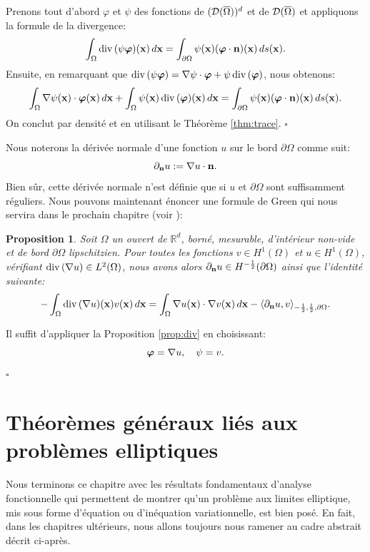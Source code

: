 \documentclass[11pt]{book}
\newtheorem{proposition}[theorem]{Proposition}
\newcommand{\bp}{\begin{proposition}}
\newcommand{\ep}{\end{proposition}}
\newcommand{\cqfd}{{$\mbox{}$\hfill$\square$}}
\def\n{{\bf n}}
\def\x{{\bf x}}
\newcommand{\caD}{{\cal D}}
\newcommand{\R}{\mathbb{R}}
\newcommand{\bphi}{\mbox{\boldmath{$\varphi$}}}
\renewcommand{\div} {{\rm{div} \,}}
\newcommand{\dnu}{\partial_{\n} u}
\begin{document}
\proof Prenons tout d'abord $\varphi$ et $\psi$ des fonctions de $(\caD(\overline{\Omega}))^d$ et de 
$\caD(\overline{\Omega})$ et appliquons la formule de la divergence:
\[
 \int_\Omega \div ( \psi \bphi ) (\x) \,d\x = \int_{\partial \Omega} \psi (\x) ( \bphi \cdot \n ) (\x) \,ds(\x).
\]
Ensuite, en remarquant que $\div ( \psi \bphi ) = \nabla \psi \cdot \bphi + \psi \, \div ( \bphi )$, nous obtenons:
\[
 \int_\Omega \nabla \psi (\x) \cdot \bphi (\x) \,d\x 
 + 
 \int_\Omega \psi (\x) \, \div ( \bphi ) (\x) \,d\x 
 = \int_{\partial \Omega} \psi (\x) ( \bphi \cdot \n ) (\x) \,ds(\x).
\]
On conclut par densité et en utilisant le Théorème \ref{thm:trace}.
\cqfd

\medskip

Nous noterons la dérivée normale d'une fonction $u$ sur le bord $\partial \Omega$ comme suit:
\[\dnu := \nabla u \cdot \n.\] 
Bien sûr, cette dérivée normale n'est définie que si $u$ et $\partial \Omega$ sont suffisamment réguliers.
Nous pouvons maintenant énoncer une formule de Green qui nous servira dans le prochain chapitre (voir \cite[Corollary B.59]{ern-guermond-04}):

\bp \label{prop:Green} Soit $\Omega$ un ouvert de $\R^d$, borné, mesurable, d'intérieur non-vide et de bord  $\partial \Omega$ lipschitzien. Pour toutes les fonctions $v\in H^1(\Omega)$ et $u\in H^1(\Omega)$, vérifiant $\div ( \nabla u)\in L^2(\Omega)$, nous avons alors %
$ \dnu \in H^{-\frac12}(\partial \Omega)$ ainsi que l'identité suivante:
\[
- \int_\Omega \div (\nabla u) (\x) v(\x) \,d\x 
= 
\int_\Omega \nabla u (\x) \cdot \nabla v (\x) \,d\x
- \langle \dnu , v \rangle_{-\frac12,\frac12,\partial \Omega}.
\]
\ep
 
\proof Il suffit d'appliquer la Proposition \ref{prop:div} en choisissant:
\[
 \bphi = \nabla u, \quad \psi = v.
\]
\cqfd
 
\section{Théorèmes généraux liés aux problèmes elliptiques} 

Nous terminons ce chapitre avec les résultats fondamentaux d'analyse fonctionnelle qui permettent de montrer qu'un problème aux limites elliptique, mis sous forme d'équation ou d'inéquation variationnelle, est bien posé.
En fait, dans les chapitres ultérieurs, nous allons toujours nous ramener au cadre abstrait décrit ci-après.
\end{document}
